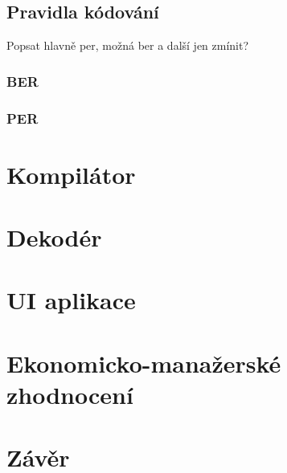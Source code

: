 \section{Pravidla kódování}
Popsat hlavně per, možná ber a další jen zmínit?

\subsection{BER}

\subsection{PER}

\chapter{Kompilátor}

\chapter{Dekodér}

\chapter{UI aplikace}

\chapter{Ekonomicko-manažerské zhodnocení}

\chapter{Závěr}